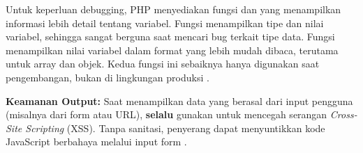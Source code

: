 Untuk keperluan debugging, PHP menyediakan fungsi  dan  yang menampilkan informasi lebih detail tentang variabel. Fungsi  menampilkan tipe dan nilai variabel, sehingga sangat berguna saat mencari bug terkait tipe data. Fungsi  menampilkan nilai variabel dalam format yang lebih mudah dibaca, terutama untuk array dan objek. Kedua fungsi ini sebaiknya hanya digunakan saat pengembangan, bukan di lingkungan produksi \cite{phpRightWay}.

\begin{catatan}
\textbf{Keamanan Output:} Saat menampilkan data yang berasal dari input pengguna (misalnya dari form atau URL), \textbf{selalu} gunakan  untuk mencegah serangan \textit{Cross-Site Scripting} (XSS). Tanpa sanitasi, penyerang dapat menyuntikkan kode JavaScript berbahaya melalui input form \cite{owaspXss}.
\end{catatan}

